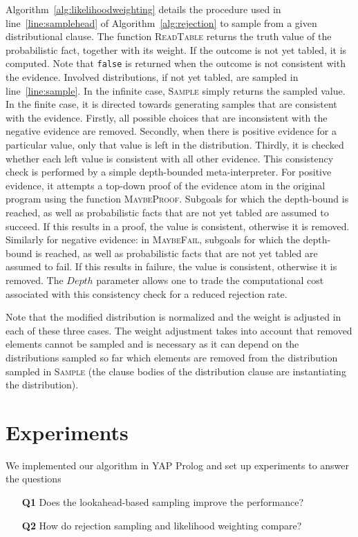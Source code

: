 \documentclass{tlp}
\begin{document}
Algorithm~\ref{alg:likelihoodweighting} details the procedure used in
line~\ref{line:samplehead} of Algorithm~\ref{alg:rejection} to sample
from a given distributional clause. The function \textsc{ReadTable}
returns the truth value of the probabilistic fact, together with its
weight. If the outcome is not yet tabled, it is computed. Note that
\texttt{false} is returned when the outcome is not consistent with the
evidence. Involved distributions, if not yet tabled, are sampled in
line~\ref{line:sample}. In the infinite case, \textsc{Sample} simply
returns the sampled value. In the finite case, it is directed towards
generating samples that are consistent with the evidence. Firstly, all
possible choices that are inconsistent with the negative evidence are
removed. Secondly, when there is positive evidence for a particular
value, only that value is left in the distribution. Thirdly, it is
checked whether each left value is consistent with all other
evidence. This consistency check is performed by a simple
depth-bounded meta-interpreter. For positive evidence, it attempts a
top-down proof of the evidence atom in the original program using the
function \textsc{MaybeProof}. Subgoals for which the depth-bound is
reached, as well as probabilistic facts that are not yet tabled are
assumed to succeed. If this results in a proof, the value is
consistent, otherwise it is removed. Similarly for negative evidence:
in \textsc{MaybeFail}, subgoals for which the depth-bound is reached,
as well as probabilistic facts that are not yet tabled are assumed to
fail. If this results in failure, the value is consistent, otherwise
it is removed. The $Depth$ parameter allows one to trade the
computational cost associated with this consistency check for a
reduced rejection rate.

Note that the modified distribution is normalized and the weight is
adjusted in each of these three cases. The weight adjustment takes
into account that removed elements cannot be sampled and is necessary
as it can depend on the distributions sampled so far which elements
are removed from the distribution sampled in \textsc{Sample} (the
clause bodies of the distribution clause are instantiating the
distribution).

\section{Experiments}
\label{sec:experiments}

We implemented our algorithm in YAP Prolog and set up experiments to
answer the questions
\begin{itemize}
\item[\textbf{Q1}] Does the lookahead-based sampling improve the
  performance?
\item[\textbf{Q2}] How do rejection sampling and likelihood weighting compare?
\end{itemize}
\end{document}
